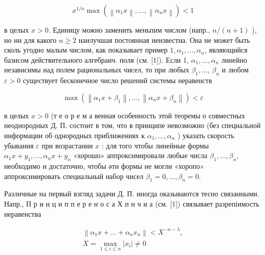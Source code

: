 \documentclass[10pt]{article}
\begin{document}
\[

x^{1 / n} \max \left(\left\|\alpha_{1} x\right\|, \ldots,\left\|\alpha_{n} x\right\|\right)<1

\]



в целых $x>0$. Единицу можно заменить меньпим числом (напр., $n /(n+1)$ ), но ни для какого $n \geqslant 2$ наилучшая постоянная неизвестна. Она не может быть сколь угодно малым числом, как показывает пример $1, \alpha_{1}, \ldots, \alpha_{n}$, являющийся базисом действительного алгебраич. поля (см. [1]). Если 1, $\alpha_{1}, \ldots, \alpha_{n}$ линейно независимы над полем рациональных чисел, то при любых $\beta_{1}, \ldots$, $\beta_{n}$ и любом $\varepsilon>0$ существует бесконечное число решений системы неравенств



\[

\max \left(\left\|\alpha_{1} x+\beta_{1}\right\|, \ldots,\left\|\alpha_{n} x+\beta_{n}\right\|\right)<\varepsilon

\]



в целых $x>0$ (т е о р е м а венная особенность этой теоремы о совместных неоднородных Д. П. состоит в том, что в принципе невозможно (без специальной информации об однородных приближениях к $\alpha_{1}, \ldots, \alpha_{n}$ ) указать скорость убывания $\varepsilon$ при возрастании $x$ : для того чтобы линейные формы $\alpha_{1} x+y_{1}, \ldots, \alpha_{n} x+y_{n}$ «хорошо» аппроксимировали любые числа $\beta_{1}, \ldots, \beta_{n}$, необходимо и достаточно, чтобы әти формы не могли «хоропо» аппроксимировать специальный набор чисел $\beta_{1}=0, \ldots, \beta_{n}=0$.



Различные на первый взгляд задачи Д. П. иногда оказываются тесно связанными. Напр., П р и н ц и п п е р е н о с а Х п н ч и а (см. [1]) связывает разрепіимость неравенства



\[

\begin{gathered}

\left\|\alpha_{1} x+\ldots+\alpha_{n} x_{n}\right\|<X^{-n-\lambda}, \\

X=\max _{1 \leqslant i \leqslant n}\left|x_{i}\right| \neq 0

\end{gathered}

\]
\end{document}
